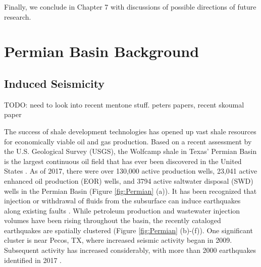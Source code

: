 \documentclass{utexasthesis}
\begin{document}
Finally, we conclude in Chapter 7 with discussions of possible directions of future research.







%
%
%
%
%
%
%
%



\chapter{Permian Basin Background}
\label{chap2}

\section{Induced Seismicity}


TODO: need to look into recent mentone stuff. peters papers, recent skoumal paper

The success of shale development technologies \citep{Waters2006use} has opened up vast shale resources for economically viable oil and gas production. Based on a recent assessment by the U.S. Geological Survey (USGS), the Wolfcamp shale in Texas' Permian Basin is the largest continuous oil field that has ever been discovered in the United States \citep{GaswirthAssessment2016}. As of 2017, there were over 130,000 active production wells, 23,041 active enhanced oil production (EOR) wells, and 3794 active saltwater disposal (SWD) wells in the Permian Basin (Figure \ref{fig:Permian} (a)). It has been recognized that injection or withdrawal of fluids from the subsurface can induce earthquakes along existing faults \citep{Ellsworth2013, simpson1988two}. While petroleum production and wastewater injection volumes have been rising throughout the basin, the recently cataloged earthquakes are spatially clustered (Figure \ref{fig:Permian} (b)-(f)). One significant cluster is near Pecos, TX, where increased seismic activity began in 2009. Subsequent activity has increased considerably, with more than 2000 earthquakes identified in 2017 \citep{Frohlich2019}.
\end{document}
